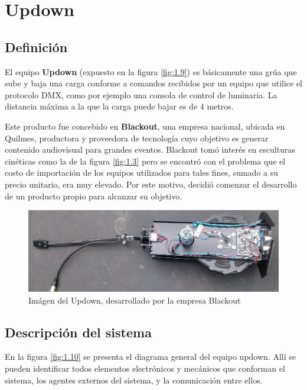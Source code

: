 \section{Updown} \label{sec:\thesection}
\subsection{Definición}
El equipo \textbf{Updown} (expuesto en la figura \ref{fig:1.9}) es básicamente una grúa que sube y baja una carga conforme a comandos recibidos por un equipo que utilice el protocolo DMX, como por ejemplo una consola de control de luminaria. La distancia máxima a la que la carga puede bajar es de 4 metros.

Este producto fue concebido en \textbf{Blackout}, una empresa nacional, ubicada en Quilmes, productora y proveedora de tecnología cuyo objetivo es generar contenido audiovisual para grandes eventos. Blackout tomó interés en esculturas cinéticas como la de la figura \ref{fig:1.3} pero se encontró con el problema que el costo de importación de los equipos utilizados para tales fines, sumado a su precio unitario, era muy elevado. Por este motivo, decidió comenzar el desarrollo de un producto propio para alcanzar su objetivo.\\

\begin{figure}[!ht]
	\centering
	\includegraphics[width=15cm,scale=1]{resources/1_9-updown.jpg}
	\caption{Imágen del Updown, desarrollado por la empresa Blackout}
	\label{fig:\thefigure}
\end{figure}
\newpage
\subsection{Descripción del sistema}

En la figura \ref{fig:1.10} se presenta el diagrama general del equipo updown. Allí se pueden identificar todos elementos electrónicos y mecánicos que conforman el sistema, los agentes externos del sistema, y la comunicación entre ellos.


